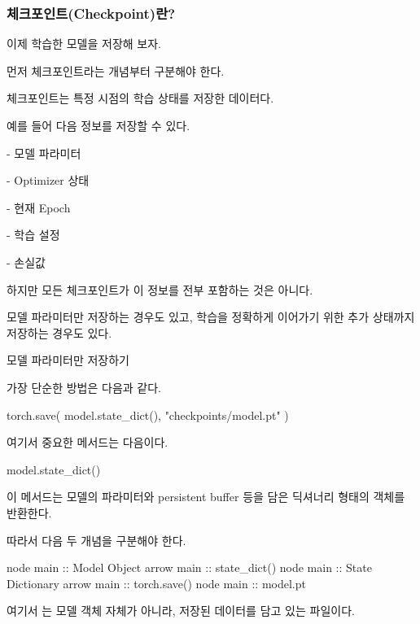 \subsubsection{체크포인트(Checkpoint)란?}

이제 학습한 모델을 저장해 보자.

먼저 체크포인트라는 개념부터 구분해야 한다.

체크포인트는 특정 시점의 학습 상태를 저장한 데이터다.

예를 들어 다음 정보를 저장할 수 있다.

\begin{dhksmry}
    - 모델 파라미터

    - Optimizer 상태

    - 현재 Epoch

    - 학습 설정

    - 손실값
\end{dhksmry}

하지만 모든 체크포인트가 이 정보를 전부 포함하는 것은 아니다.

모델 파라미터만 저장하는 경우도 있고, 학습을 정확하게 이어가기 위한 추가 상태까지 저장하는 경우도 있다.

\begin{dhknote}
\begin{dhksmry}[centered]
모델 파라미터만 저장하기
\end{dhksmry}
\end{dhknote}

가장 단순한 방법은 다음과 같다.

\begin{dhkcode}
torch.save(
    model.state_dict(),
    "checkpoints/model.pt"
)
\end{dhkcode}

여기서 중요한 메서드는 다음이다.

\begin{dhkcode}
model.state_dict()
\end{dhkcode}

이 메서드는 모델의 파라미터와 persistent buffer 등을 담은 딕셔너리 형태의 객체를 반환한다.

따라서 다음 두 개념을 구분해야 한다.

\begin{dhkbranch}[in=8]
node main :: Model Object
arrow main :: state_dict()
node main :: State Dictionary
arrow main :: torch.save()
node main :: model.pt
\end{dhkbranch}

여기서 는 모델 객체 자체가 아니라, 저장된 데이터를 담고 있는 파일이다.

